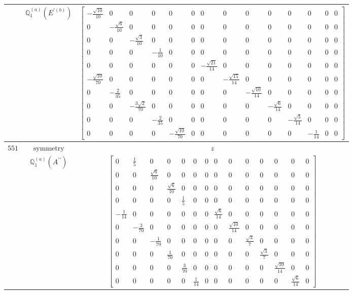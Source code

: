 \documentclass[fleqn,8pt,landscape]{jsarticle}
\begin{document}
\begin{longtable}{ccc}
$  $ & $ \mathbb{Q}_{1}^{(a)}(E^{\prime(b)}) $ & $ \begin{bmatrix} - \frac{\sqrt{10}}{10} & 0 & 0 & 0 & 0 & 0 & 0 & 0 & 0 & 0 & 0 & 0 & 0 & 0 \\ 0 & - \frac{\sqrt{6}}{10} & 0 & 0 & 0 & 0 & 0 & 0 & 0 & 0 & 0 & 0 & 0 & 0 \\ 0 & 0 & - \frac{\sqrt{3}}{10} & 0 & 0 & 0 & 0 & 0 & 0 & 0 & 0 & 0 & 0 & 0 \\ 0 & 0 & 0 & - \frac{1}{10} & 0 & 0 & 0 & 0 & 0 & 0 & 0 & 0 & 0 & 0 \\ 0 & 0 & 0 & 0 & 0 & 0 & - \frac{\sqrt{21}}{14} & 0 & 0 & 0 & 0 & 0 & 0 & 0 \\ - \frac{\sqrt{10}}{70} & 0 & 0 & 0 & 0 & 0 & 0 & - \frac{\sqrt{15}}{14} & 0 & 0 & 0 & 0 & 0 & 0 \\ 0 & - \frac{2}{35} & 0 & 0 & 0 & 0 & 0 & 0 & - \frac{\sqrt{10}}{14} & 0 & 0 & 0 & 0 & 0 \\ 0 & 0 & - \frac{3 \sqrt{2}}{70} & 0 & 0 & 0 & 0 & 0 & 0 & - \frac{\sqrt{6}}{14} & 0 & 0 & 0 & 0 \\ 0 & 0 & 0 & - \frac{2}{35} & 0 & 0 & 0 & 0 & 0 & 0 & - \frac{\sqrt{3}}{14} & 0 & 0 & 0 \\ 0 & 0 & 0 & 0 & - \frac{\sqrt{10}}{70} & 0 & 0 & 0 & 0 & 0 & 0 & - \frac{1}{14} & 0 & 0 \end{bmatrix} $ \\ \hline
$ 551 $ & $ \text{symmetry} $ & $ z $ \\
$  $ & $ \mathbb{Q}_{1}^{(a)}(A^{\prime\prime}) $ & $ \begin{bmatrix} 0 & \frac{1}{5} & 0 & 0 & 0 & 0 & 0 & 0 & 0 & 0 & 0 & 0 & 0 & 0 \\ 0 & 0 & \frac{\sqrt{6}}{10} & 0 & 0 & 0 & 0 & 0 & 0 & 0 & 0 & 0 & 0 & 0 \\ 0 & 0 & 0 & \frac{\sqrt{6}}{10} & 0 & 0 & 0 & 0 & 0 & 0 & 0 & 0 & 0 & 0 \\ 0 & 0 & 0 & 0 & \frac{1}{5} & 0 & 0 & 0 & 0 & 0 & 0 & 0 & 0 & 0 \\ - \frac{1}{14} & 0 & 0 & 0 & 0 & 0 & 0 & \frac{\sqrt{6}}{14} & 0 & 0 & 0 & 0 & 0 & 0 \\ 0 & - \frac{3}{70} & 0 & 0 & 0 & 0 & 0 & 0 & \frac{\sqrt{10}}{14} & 0 & 0 & 0 & 0 & 0 \\ 0 & 0 & - \frac{1}{70} & 0 & 0 & 0 & 0 & 0 & 0 & \frac{\sqrt{3}}{7} & 0 & 0 & 0 & 0 \\ 0 & 0 & 0 & \frac{1}{70} & 0 & 0 & 0 & 0 & 0 & 0 & \frac{\sqrt{3}}{7} & 0 & 0 & 0 \\ 0 & 0 & 0 & 0 & \frac{3}{70} & 0 & 0 & 0 & 0 & 0 & 0 & \frac{\sqrt{10}}{14} & 0 & 0 \\ 0 & 0 & 0 & 0 & 0 & \frac{1}{14} & 0 & 0 & 0 & 0 & 0 & 0 & \frac{\sqrt{6}}{14} & 0 \end{bmatrix} $ \\ \hline

\end{longtable}
\end{document}
